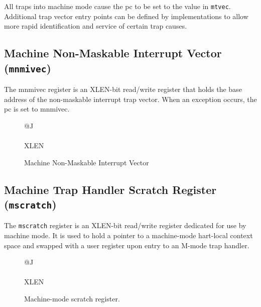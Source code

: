 \fi

All traps into machine mode cause the pc to be set to the value in
\texttt{mtvec}. Additional trap vector entry points can be defined by
implementations to allow more rapid identification and service of
certain trap causes.

\subsection{Machine Non-Maskable Interrupt Vector
(\texttt{mnmivec})}\label{machine-non-maskable-interrupt-vector-mnmivec}

The mnmivec register is an XLEN-bit read/write register that holds the
base address of the non-maskable interrupt trap vector. When an
exception occurs, the pc is set to mnmivec.

\ifdefined\MARKDOWN
\else

\begin{figure}[htb]
	{\footnotesize
		\begin{center}
			\begin{tabular}{@{}J}
				 \\
				\hline
				 \\
				\hline
				XLEN \\
			\end{tabular}
		\end{center}
	}
	\vspace{-0.1in}
	\caption{Machine Non-Maskable Interrupt Vector}
	\label{fig:mnmivecreg}
\end{figure}

\fi

\subsection{Machine Trap Handler Scratch Register
(\texttt{mscratch})}\label{machine-trap-handler-scratch-register-mscratch}

The \texttt{mscratch} register is an XLEN-bit read/write register dedicated for
use by machine mode. It is used to hold a pointer to a machine-mode
hart-local context space and swapped with a user register upon entry to
an M-mode trap handler.

\ifdefined\MARKDOWN
\else

\begin{figure}[htb]
	{\footnotesize
		\begin{center}
			\begin{tabular}{@{}J}
				\instbitrange{XLEN-1}{0} \\
				\hline
				\multicolumn{1}{|c|}{\texttt{mscratch}} \\
				\hline
				XLEN \\
			\end{tabular}
		\end{center}
	}
	\vspace{-0.1in}
	\caption{Machine-mode scratch register.}
	\label{fig:mscratchreg}
\end{figure}

